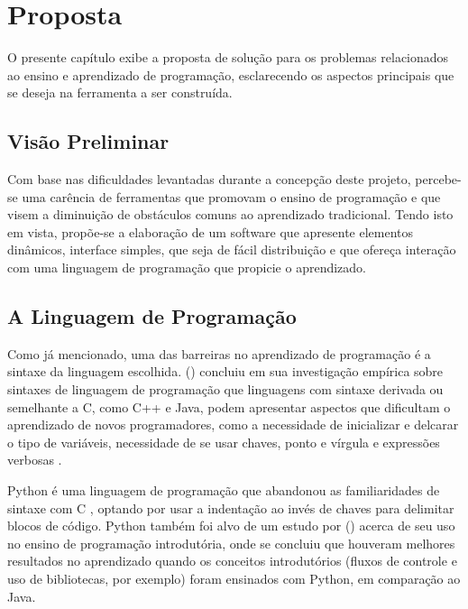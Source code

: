 \chapter[Proposta]{Proposta}

O presente capítulo exibe a proposta de solução para os problemas relacionados ao ensino e aprendizado
de programação, esclarecendo os aspectos principais que se deseja na ferramenta a ser construída.

\section{Visão Preliminar}

Com base nas dificuldades levantadas durante a concepção deste projeto, percebe-se uma carência de ferramentas que promovam o ensino de programação e que visem a diminuição de obstáculos comuns ao aprendizado tradicional. Tendo isto em vista, propõe-se a elaboração de um software que apresente elementos dinâmicos, interface simples, que seja de fácil distribuição e que ofereça interação com uma linguagem de programação que propicie o aprendizado.

\section{A Linguagem de Programação}

Como já mencionado, uma das barreiras no aprendizado de programação é a sintaxe da linguagem escolhida. \citeauthor{stefik2013} (\citeyear{stefik2013}) concluiu em sua investigação empírica sobre sintaxes de linguagem de programação que linguagens com sintaxe derivada ou semelhante a C, como C++ e Java, podem apresentar aspectos que dificultam o aprendizado de novos programadores, como a necessidade de inicializar e delcarar o tipo de variáveis, necessidade de se usar chaves, ponto e vírgula e expressões verbosas \cite{mannila2006}.

Python é uma linguagem de programação que abandonou as familiaridades de sintaxe com C \cite{stefik2013}, optando por usar a indentação ao invés de chaves para delimitar blocos de código. Python também foi alvo de um estudo por \citeauthor{jayal2015} (\citeyear{jayal2015}) acerca de seu uso no ensino de programação introdutória, onde se concluiu que houveram melhores resultados no aprendizado quando os conceitos introdutórios (fluxos de controle e uso de bibliotecas, por exemplo) foram ensinados com Python, em comparação ao Java.

